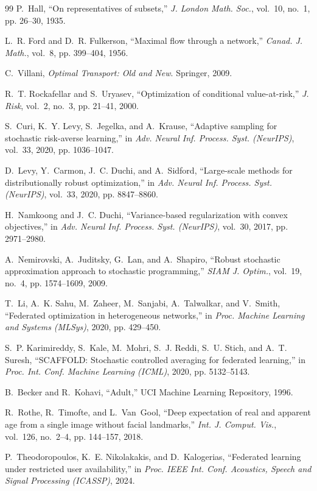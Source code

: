 \documentclass{article}
\theoremstyle{definition}
\begin{document}
\begin{thebibliography}{99}
P.~Hall, ``On representatives of subsets,'' \emph{J. London Math. Soc.},
vol.~10, no.~1, pp. 26--30, 1935.

L.~R. Ford and D.~R. Fulkerson, ``Maximal flow through a network,'' \emph{Canad.
J. Math.}, vol.~8, pp. 399--404, 1956.

C.~Villani, \emph{Optimal Transport: Old and New}. Springer, 2009.

R.~T. Rockafellar and S.~Uryasev, ``Optimization of conditional value-at-risk,''
\emph{J. Risk}, vol.~2, no.~3, pp. 21--41, 2000.

S.~Curi, K.~Y. Levy, S.~Jegelka, and A.~Krause, ``Adaptive sampling for
stochastic risk-averse learning,'' in \emph{Adv. Neural Inf. Process. Syst.
(NeurIPS)}, vol.~33, 2020, pp. 1036--1047.

D.~Levy, Y.~Carmon, J.~C. Duchi, and A.~Sidford, ``Large-scale methods for
distributionally robust optimization,'' in \emph{Adv. Neural Inf. Process.
Syst. (NeurIPS)}, vol.~33, 2020, pp. 8847--8860.

H.~Namkoong and J.~C. Duchi, ``Variance-based regularization with convex
objectives,'' in \emph{Adv. Neural Inf. Process. Syst. (NeurIPS)}, vol.~30,
2017, pp. 2971--2980.

A.~Nemirovski, A.~Juditsky, G.~Lan, and A.~Shapiro, ``Robust stochastic
approximation approach to stochastic programming,'' \emph{SIAM J. Optim.},
vol.~19, no.~4, pp. 1574--1609, 2009.

T.~Li, A.~K. Sahu, M.~Zaheer, M.~Sanjabi, A.~Talwalkar, and V.~Smith,
``Federated optimization in heterogeneous networks,'' in \emph{Proc. Machine
Learning and Systems (MLSys)}, 2020, pp. 429--450.

S.~P. Karimireddy, S.~Kale, M.~Mohri, S.~J. Reddi, S.~U. Stich, and A.~T.
Suresh, ``SCAFFOLD: Stochastic controlled averaging for federated learning,''
in \emph{Proc. Int. Conf. Machine Learning (ICML)}, 2020, pp. 5132--5143.

B.~Becker and R.~Kohavi, ``Adult,'' UCI Machine Learning Repository, 1996.

R.~Rothe, R.~Timofte, and L.~Van~Gool, ``Deep expectation of real and apparent
age from a single image without facial landmarks,'' \emph{Int. J. Comput.
Vis.}, vol.~126, no.~2--4, pp. 144--157, 2018.

P.~Theodoropoulos, K.~E. Nikolakakis, and D.~Kalogerias, ``Federated learning
under restricted user availability,'' in \emph{Proc. IEEE Int. Conf. Acoustics,
Speech and Signal Processing (ICASSP)}, 2024.

\end{thebibliography}
\end{document}
